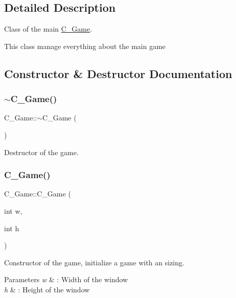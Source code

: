 \subsection{Detailed Description}
Class of the main \hyperlink{classC__Game}{C\+\_\+\+Game}. 

This class manage everything about the main game 

\subsection{Constructor \& Destructor Documentation}
\mbox{\label{classC__Game_a4a11981e90a66634568f59ac823a697e}} 
\subsubsection{\texorpdfstring{$\sim$\+C\+\_\+\+Game()}{~C\_Game()}\hspace{0.1cm}{\footnotesize\ttfamily [1/2]}}
{\footnotesize\ttfamily C\+\_\+\+Game\+::$\sim$\+C\+\_\+\+Game (\begin{DoxyParamCaption}{ }\end{DoxyParamCaption})}



Destructor of the game. 

\mbox{\label{classC__Game_ac5a1aba1deb606a281d3992459566716}} 
\subsubsection{\texorpdfstring{C\+\_\+\+Game()}{C\_Game()}\hspace{0.1cm}{\footnotesize\ttfamily [1/2]}}
{\footnotesize\ttfamily C\+\_\+\+Game\+::\+C\+\_\+\+Game (\begin{DoxyParamCaption}\item[{int}]{w,  }\item[{int}]{h }\end{DoxyParamCaption})}



Constructor of the game, initialize a game with an sizing. 


\begin{DoxyParams}{Parameters}
{\em w} & \+: Width of the window \\
\hline
{\em h} & \+: Height of the window \\
\hline
\end{DoxyParams}
\mbox{\label{classC__Game_a4a11981e90a66634568f59ac823a697e}} 

